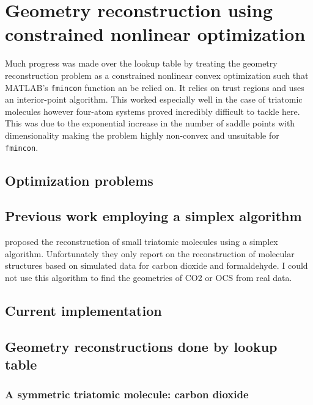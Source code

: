 \chapter{Geometry reconstruction using constrained nonlinear optimization}\label{ch:optimization}

Much progress was made over the lookup table by treating the geometry reconstruction problem as a constrained nonlinear convex optimization such that MATLAB's \texttt{fmincon} function an be relied on. It relies on trust regions and uses an interior-point algorithm. This worked especially well in the case of triatomic molecules however four-atom systems proved incredibly difficult to tackle here. This was due to the exponential increase in the number of saddle points with dimensionality \footnotemark making the problem highly non-convex and unsuitable for \texttt{fmincon}.


\section{Optimization problems}
\section{Previous work employing a simplex algorithm}
\citet{Brichta09} proposed the reconstruction of small triatomic molecules using a simplex algorithm. Unfortunately they only report on the reconstruction of molecular structures based on simulated data for carbon dioxide and formaldehyde. I could not use this algorithm to find the geometries of CO2 or OCS from real data.

\section{Current implementation}

\section{Geometry reconstructions done by lookup table}
\subsection{A symmetric triatomic molecule: carbon dioxide}
